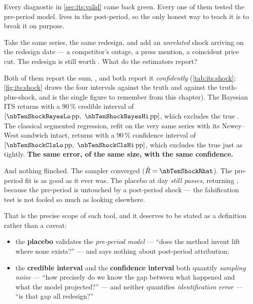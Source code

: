 Every diagnostic in \cref{sec:its:valid} came back green. Every one of them tested the pre-period
model.  lives in the post-period, so the only honest way to teach it is to break
it on purpose.

Take the same series, the same \pp{+\nbTenTrueLift} redesign, and add an \emph{unrelated}
\pp{+\nbTenShock} shock arriving on the redesign date --- a competitor's outage, a press mention, a
coincident price cut. The redesign is still worth \pp{+\nbTenTrueLift}. What do the estimators
report?




Both of them report the sum, \pp{\nbTenShockSum}, and both report it \emph{confidently}
(\cref{tab:its:shock}; \cref{fig:its:shock} draws the four intervals against the truth and against
the truth-plus-shock, and is the single figure to remember from this chapter). The
Bayesian ITS returns \pp{\nbTenShockBayes} with a 90\,\% credible interval of
$[\pp{\nbTenShockBayesLo},\ \pp{\nbTenShockBayesHi}]$, which excludes the true
\pp{+\nbTenTrueLift}. The classical segmented regression, refit on the very same series with its
Newey--West sandwich intact, returns \pp{\nbTenShockCls} with a 90\,\% confidence interval of
$[\pp{\nbTenShockClsLo},\ \pp{\nbTenShockClsHi}]$, which excludes the true \pp{+\nbTenTrueLift}
just as tightly. \textbf{The same error, of the same size, with the same confidence.}

And nothing flinched. The sampler converged ($\hat R = \nbTenShockRhat$). The pre-period fit is as
good as it ever was. The placebo at day \nbTenFakeDay{} \emph{still passes}, returning
\pp{\nbTenShockPlacebo}, because the pre-period is untouched by a post-period shock --- the
falsification test is not fooled so much as looking elsewhere.

That is the precise scope of each tool, and it deserves to be stated as a definition rather than a
caveat:

\begin{itemize}[leftmargin=*]
  \item the \textbf{placebo} validates the \emph{pre-period model} --- ``does the method invent
        lift where none exists?'' --- and says nothing about post-period attribution;
  \item the \textbf{credible interval} and the \textbf{confidence interval} both quantify
        \emph{sampling noise} --- ``how precisely do we know the gap between what happened and what
        the model projected?'' --- and neither quantifies \emph{identification error} --- ``is that
        gap all redesign?''
\end{itemize}

